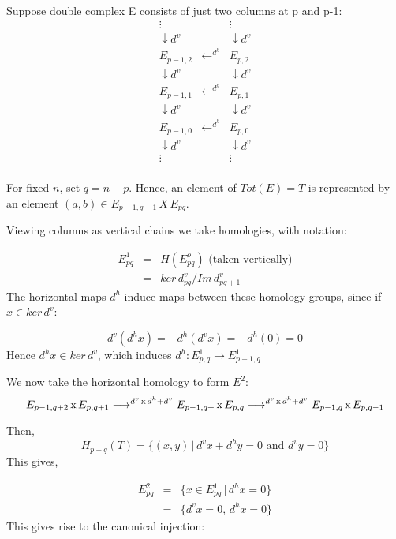 Suppose double complex E consists of just two columns at p and
p-1:
\begin{equation}
\nonumber \begin{array}{ccc}
  \vdots      \,     &                         & \vdots \,\\
  \downarrow d^v  &                         & \downarrow d^v \\
  E_{p-1,2}        &\longleftarrow^{d^h}       & E_{p,2} \\
  \downarrow d^v  &                         &  \downarrow d^v \\
  E_{p-1,1}       &\longleftarrow^{d^h}         & E_{p,1} \\
  \downarrow d^v &                          & \downarrow d^v \\
  E_{p-1,0}        & \longleftarrow^{d^h}       & E_{p,0} \\
  \downarrow d^v  &                         & \downarrow d^v \\
  \vdots        \,   &                         & \vdots \,\\
\end{array}
\end{equation}

For fixed $n$, set $q=n-p$. Hence, an element of $Tot(E) =T$ is
represented by an element $(a,b)\in E_{p-1,q+1}\, X \, E_{pq}$.

Viewing columns as vertical chains we take homologies, with
notation:

\begin{eqnarray}
\nonumber E^1_{pq} &=& H( E^o_{pq} ) \text{ (taken vertically)}\\
\nonumber          &=& {ker\, d^v_{pq}} / {Im\, d^v_{pq+1}}
\end{eqnarray}
The horizontal maps $d^h$ induce maps between these homology
groups, since if $x\in ker\, d^v$:

$$d^v(d^h x) = -d^h (d^v x) = -d^h (0) = 0$$
Hence $d^h x \in ker\, d^v$, which induces $d^h : E^1_{p,q}
\rightarrow E^1_{p-1, q}$

We now take the horizontal homology to form $E^2$:
$$ E_{p-1,q+2}\, \text x \, E_{p,q+1} \longrightarrow^{d^v\, \text x \, d^h +d^v} E_{p-1,q+}\, \text x \, E_{p,q}
\longrightarrow^{d^v\, \text x \, d^h +d^v} E_{p-1,q}\, \text x \,
E_{p,q-1}$$

Then,
$$H_{p+q}(T) = \{(x,y)\,  | \, d^v x +d^h y = 0 \text{ and } d^v y = 0
\}$$ This gives,

\begin{eqnarray}
\nonumber E_{pq}^2 &=& \{ x\in E^1_{pq} \, |\, d^h x = 0\}\\
\nonumber          &=& \{ d^v x = 0 ,\, d^h x = 0 \}
                   \end{eqnarray}
This gives rise to the canonical injection:

